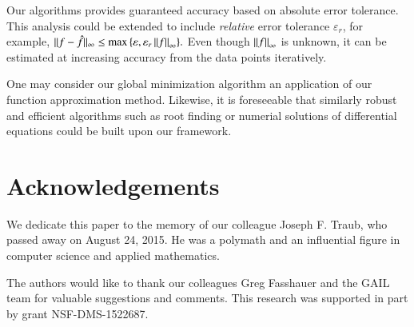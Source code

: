\documentclass[review]{elsarticle}
\theoremstyle{definition}
\begin{document}
Our algorithms provides guaranteed accuracy based on absolute error tolerance.
This analysis could be extended to include \emph{relative} error tolerance
$\varepsilon_r$, for example, $ \| f -\hat{f} \|_{\infty} \le \max{
\{\varepsilon, \varepsilon_r \norm[\infty]{f} \} }.$ Even though
$\norm[\infty]{f}$ is unknown, it can be estimated at increasing accuracy from
the data points iteratively.

One may consider our global minimization algorithm an application of our
function approximation method. Likewise, it is foreseeable that 
similarly robust and efficient algorithms such as root finding or
numerial solutions of differential equations could be built upon our framework.


\section*{Acknowledgements}
We dedicate this paper to the memory of our colleague Joseph F. Traub, who
passed away on August 24, 2015. He was a polymath and an influential figure in
computer science and applied mathematics.

The authors would like to thank our colleagues Greg Fasshauer and the GAIL team
for valuable suggestions and comments. This research was supported in part by
grant NSF-DMS-1522687.





\end{document}
